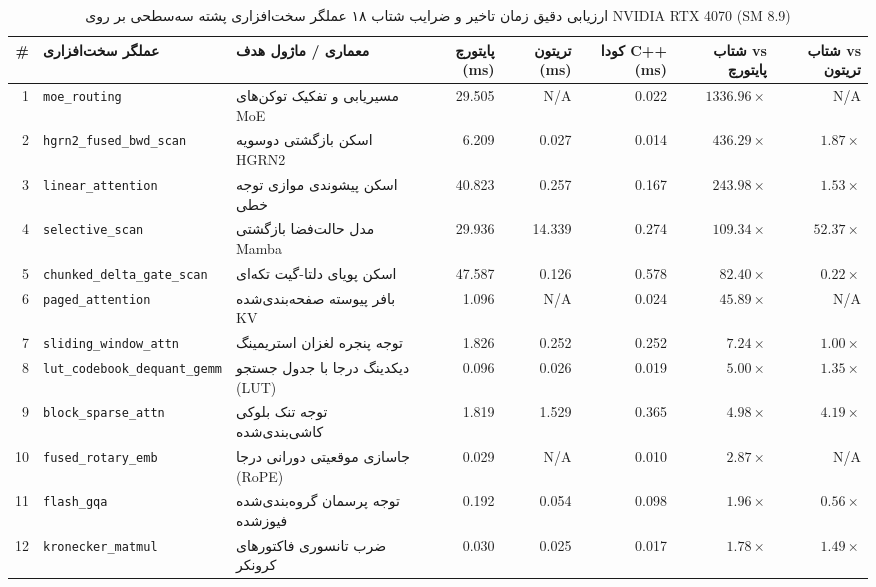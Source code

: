 \begin{table}[H]
\centering
\caption{ارزیابی دقیق زمان تاخیر و ضرایب شتاب ۱۸ عملگر سخت‌افزاری پشته سه‌سطحی بر روی NVIDIA RTX 4070 (SM 8.9)}
\label{tab:app_cuda_benchmark_18}
\scriptsize
\setlength{\tabcolsep}{3.5pt}
\begin{tabular}{rllrrrrr}
\toprule
\textbf{\#} & \textbf{عملگر سخت‌افزاری} & \textbf{معماری / ماژول هدف} & \textbf{پایتورچ (ms)} & \textbf{تریتون (ms)} & \textbf{کودا C++ (ms)} & \textbf{شتاب vs پایتورچ} & \textbf{شتاب vs تریتون} \\
\midrule
1 & \texttt{moe\_routing} & مسیریابی و تفکیک توکن‌های MoE & 29.505 & N/A & 0.022 & $\mathbf{1336.96\times}$ & N/A \\
2 & \texttt{hgrn2\_fused\_bwd\_scan} & اسکن بازگشتی دوسویه HGRN2 & 6.209 & 0.027 & 0.014 & $\mathbf{436.29\times}$ & $\mathbf{1.87\times}$ \\
3 & \texttt{linear\_attention} & اسکن پیشوندی موازی توجه خطی & 40.823 & 0.257 & 0.167 & $\mathbf{243.98\times}$ & $\mathbf{1.53\times}$ \\
4 & \texttt{selective\_scan} & مدل حالت‌فضا بازگشتی Mamba & 29.936 & 14.339 & 0.274 & $\mathbf{109.34\times}$ & $\mathbf{52.37\times}$ \\
5 & \texttt{chunked\_delta\_gate\_scan} & اسکن پویای دلتا-گیت تکه‌ای & 47.587 & 0.126 & 0.578 & $\mathbf{82.40\times}$ & $0.22\times$ \\
6 & \texttt{paged\_attention} & بافر پیوسته صفحه‌بندی‌شده KV & 1.096 & N/A & 0.024 & $\mathbf{45.89\times}$ & N/A \\
7 & \texttt{sliding\_window\_attn} & توجه پنجره لغزان استریمینگ & 1.826 & 0.252 & 0.252 & $\mathbf{7.24\times}$ & $1.00\times$ \\
8 & \texttt{lut\_codebook\_dequant\_gemm} & دیکدینگ درجا با جدول جستجو (LUT) & 0.096 & 0.026 & 0.019 & $\mathbf{5.00\times}$ & $\mathbf{1.35\times}$ \\
9 & \texttt{block\_sparse\_attn} & توجه تنک بلوکی کاشی‌بندی‌شده & 1.819 & 1.529 & 0.365 & $\mathbf{4.98\times}$ & $\mathbf{4.19\times}$ \\
10 & \texttt{fused\_rotary\_emb} & جاسازی موقعیتی دورانی درجا (RoPE) & 0.029 & N/A & 0.010 & $\mathbf{2.87\times}$ & N/A \\
11 & \texttt{flash\_gqa} & توجه پرسمان گروه‌بندی‌شده فیوزشده & 0.192 & 0.054 & 0.098 & $\mathbf{1.96\times}$ & $0.56\times$ \\
12 & \texttt{kronecker\_matmul} & ضرب تانسوری فاکتورهای کرونکر & 0.030 & 0.025 & 0.017 & $\mathbf{1.78\times}$ & $\mathbf{1.49\times}$ \\

\end{tabular}
\end{table}
